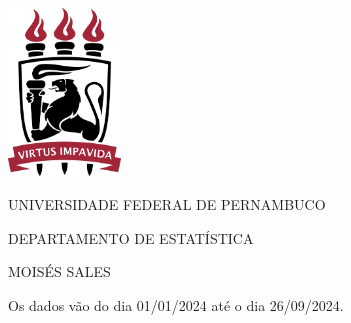 \documentclass[12pt, reqno]{amsart}
\title{}
\author{Moisés Sales}
\date{}
\begin{document}
\begin{center}

    \vspace*{1cm}

    \includegraphics[width=3cm]{images/brasao_ufpe.png} 

    \vspace{1cm}

    {UNIVERSIDADE FEDERAL DE PERNAMBUCO\par}
    {DEPARTAMENTO DE ESTATÍSTICA\par}
    {\par}

    \vspace{3cm}

    {MOISÉS SALES \par} 

    \vspace{3cm}

    {}

    \vfill %

    {\par}

\end{center}

\clearpage 

\maketitle

\tableofcontents

\newpage

Os dados vão do dia 01/01/2024 até o dia 26/09/2024.
\end{document}
